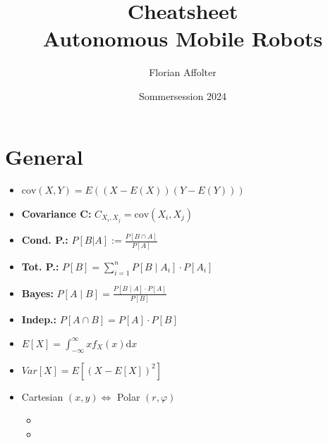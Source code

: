 \documentclass[a4paper]{article}
\title{Cheatsheet\\ Autonomous Mobile Robots}
\author{Florian Affolter}
\date{\vspace{-10pt}Sommersession 2024}
\newcommand{\ides}[1]{\item \textbf{#1}}
\begin{document}

% 


\section{General}
\begin{itemize}
    \item $\mathrm{cov}(X, Y) = E((X - E(X))(Y - E(Y)))$
    \ides{Covariance $\mathbf{C}$:} $C_{X_i,X_j} = \mathrm{cov}(X_i, X_j)$
        \\ 
    \ides{Cond. P.:} $P[B | A] := \frac{P[B \cap A]}{P[A]}$
    \ides{Tot. P.:} $P[B] = \sum_{i=1}^n P[B \mid A_i] \cdot P[A_i]$
    \ides{Bayes:} $P[A \mid B] = \frac{P[B \mid A]\cdot P[A]}{P[B]}$
    \ides{Indep.:} $P[A \cap B] = P[A] \cdot P[B]$
    \item $E[X] = \int_{-\infty}^{\infty} x f_X(x) \mathrm{d}x$
    \item $Var[X] = E[(X - E[X])^2]$
    \item Cartesian $(x, y) \Leftrightarrow$ Polar $(r, \varphi)$
        \begin{itemize}
            \item
            \item
        \end{itemize}
\end{itemize}
\end{document}
